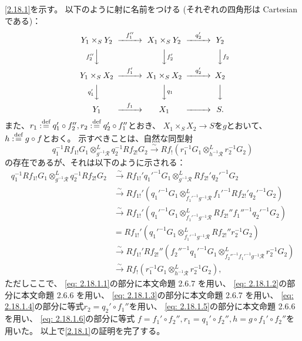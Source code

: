 \documentclass[uplatex,dvipdfmx]{jsarticle}
\makeatletter
\theoremstyle{definition}
\renewenvironment{proof}[1][\proofname]{
  \pushQED{\qed}%
  \normalfont \topsep6\p@\@plus6\p@\relax
  \trivlist
  \item[\hskip\labelsep
    #1\@addpunct{\textbf{.}}]\ignorespaces
}{%
  \popQED\endtrivlist\@endpefalse
}
\providecommand{\proofname}{証明}
\newcommand\mcR{\mathcal{R}}
\def\dfn{:\overset{\mbox{{\scriptsize def}}}{=}}
\makeatother
\begin{document}
\begin{proof}
  \ref{2.18.1}を示す。
  以下のように射に名前をつける
  (それぞれの四角形は Cartesian である)：
  \[
  \begin{CD}
    Y_1\times_S Y_2 @>{f_1''}>> X_1\times_S Y_2 @>{q_2'}>> Y_2 \\
    @V{f_2''}VV @VV{f_2'}V @VV{f_2}V \\
    Y_1\times_S X_2 @>{f_1'}>> X_1\times_S X_2 @>{q_2'}>> X_2 \\
    @V{q_1'}VV @VV{q_1}V @VVV \\
    Y_1 @>{f_1}>> X_1 @>>> S.
  \end{CD}
  \]
  また、\(r_1\dfn q_1'\circ f_2'', r_2\dfn q_2'\circ f_1''\)とおき、
  \(X_1\times_S X_2 \to S\)を\(g\)とおいて、
  \(h\dfn g\circ f\)とおく。
  示すべきことは、自然な同型射
  \[
  q_1^{-1}Rf_{1!}G_1 \otimes_{g^{-1}\mcR}^L q_2^{-1}Rf_{2!}G_2
  \xrightarrow{\sim} Rf_!(r_1^{-1}G_1\otimes_{h^{-1}\mcR}^L r_2^{-1}G_2)
  \]
  の存在であるが、それは以下のように示される：
  \begin{align}
    q_1^{-1}Rf_{1!}G_1 \otimes_{g^{-1}\mcR}^L q_2^{-1}Rf_{2!}G_2
    &\xrightarrow{\sim}
    Rf_{1!}'{q_1'}^{-1}G_1 \otimes_{g^{-1}\mcR}^L Rf_{2!}'{q_2'}^{-1}G_2
    \label{eq: 2.18.1.1} \\
    &\xrightarrow{\sim}
    Rf_{1!}'({q_1'}^{-1}G_1 \otimes_{{f_1'}^{-1}g^{-1}\mcR}^L
    {f_1'}^{-1} Rf_{2!}'{q_2'}^{-1}G_2)
    \label{eq: 2.18.1.2} \\
    &\xrightarrow{\sim}
    Rf_{1!}'({q_1'}^{-1}G_1 \otimes_{{f_1'}^{-1}g^{-1}\mcR}^L
    Rf_{2!}''{f_1''}^{-1}{q_2'}^{-1}G_2)
    \label{eq: 2.18.1.3} \\
    &= Rf_{1!}'({q_1'}^{-1}G_1 \otimes_{{f_1'}^{-1}g^{-1}\mcR}^L
    Rf_{2!}''r_2^{-1}G_2)
    \label{eq: 2.18.1.4} \\
    &\xrightarrow{\sim} Rf_{1!}'Rf_{2!}''
    ({f_2''}^{-1}{q_1'}^{-1}G_1 \otimes_{{f_2''}^{-1}{f_1'}^{-1}g^{-1}\mcR}^L r_2^{-1}G_2)
    \label{eq: 2.18.1.5} \\
    &\xrightarrow{\sim} Rf_!(r_1^{-1}G_1 \otimes_{h^{-1}\mcR}^L r_2^{-1}G_2),
    \label{eq: 2.18.1.6}
  \end{align}
  ただしここで、
  \eqref{eq: 2.18.1.1}の部分に本文命題 2.6.7 を用い、
  \eqref{eq: 2.18.1.2}の部分に本文命題 2.6.6 を用い、
  \eqref{eq: 2.18.1.3}の部分に本文命題 2.6.7 を用い、
  \eqref{eq: 2.18.1.4}の部分に等式\(r_2=q_2'\circ f_1''\)を用い、
  \eqref{eq: 2.18.1.5}の部分に本文命題 2.6.6 を用い、
  \eqref{eq: 2.18.1.6}の部分に等式
  \(f = f_1'\circ f_2'', r_1 = q_1'\circ f_2'', h = g\circ f_1'\circ f_2''\)を用いた。
  以上で\ref{2.18.1}の証明を完了する。


\end{proof}
\end{document}
